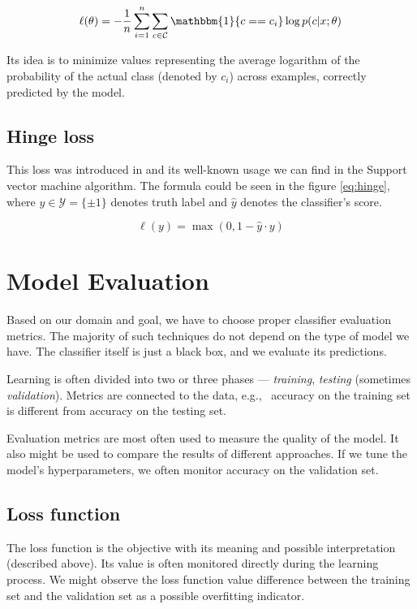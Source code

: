 \begin{equation} \label{eq:crossent}
    \ell(\theta)=-\frac{1}{n}\sum_{i=1}^{n}\sum_{c \in \mathcal{C}}\mathbbm{1}\{c==c_i\}\log p(c|x;\theta)
\end{equation}

Its idea is to minimize values representing the average logarithm of the probability of the actual class (denoted by $c_i$) across examples, correctly predicted by the model.

\subsection*{Hinge loss}
This loss was introduced in \cite{Gentile1998} and its well-known usage we can find in the Support vector machine algorithm. The formula could be seen in the figure \eqref{eq:hinge}, where $y\in\mathcal{Y}=\{\pm1\}$ denotes truth label and $\hat{y}$ denotes the classifier's score.

\begin{equation} \label{eq:hinge}
    \ell(y)=\max(0,1-\hat{y}\cdot y)
\end{equation}

\section{Model Evaluation}
Based on our domain and goal, we have to choose proper classifier evaluation metrics. The majority of such techniques do not depend on the type of model we have. The classifier itself is just a black box, and we evaluate its predictions.

Learning is often divided into two or three phases --- \emph{training}, \emph{testing} (sometimes \emph{validation}). Metrics are connected to the data, e.g., \ accuracy on the training set is different from accuracy on the testing set. 

Evaluation metrics are most often used to measure the quality of the model. It also might be used to compare the results of different approaches. If we tune the model's hyperparameters, we often monitor accuracy on the validation set.

\subsection*{Loss function}
The loss function is the objective with its meaning and possible interpretation (described above). Its value is often monitored directly during the learning process. We might observe the loss function value difference between the training set and the validation set as a possible overfitting indicator.

